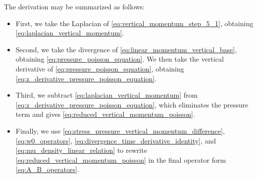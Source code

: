 \documentclass[11pt]{article}
\newenvironment{appen}{\appendix}{}
\begin{document}
\begin{appen}
The derivation may be summarized as follows:
\begin{itemize}
  \item First, we take the Laplacian of \eqref{eq:vertical_momentum_step_5_1}, obtaining \eqref{eq:laplacian_vertical_momentum}.

  \item Second, we take the divergence of \eqref{eq:linear_momentum_vertical_base}, obtaining \eqref{eq:pressure_poisson_equation}. We then take the vertical derivative of \eqref{eq:pressure_poisson_equation}, obtaining \eqref{eq:z_derivative_pressure_poisson_equation}.

  \item Third, we subtract \eqref{eq:laplacian_vertical_momentum} from \eqref{eq:z_derivative_pressure_poisson_equation}, which eliminates the pressure term and gives \eqref{eq:reduced_vertical_momentum_poisson}.

  \item Finally, we use \eqref{eq:stress_pressure_vertical_momentum_difference}, \eqref{eq:w0_operators}, \eqref{eq:divergence_time_derivative_identity}, and \eqref{eq:mu_density_linear_relation} to rewrite \eqref{eq:reduced_vertical_momentum_poisson} in the final operator form \eqref{eq:A_B_operators}.
\end{itemize}


\end{appen}
\end{document}
